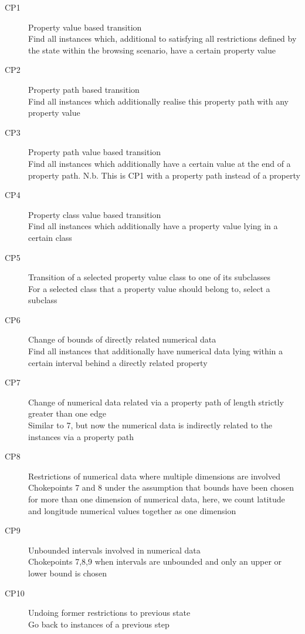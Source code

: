\begin{description}
\item[CP1] Property value based transition\\
Find all instances which, additional to satisfying all restrictions defined by the state within the browsing scenario, have a certain property value
\item[CP2] Property path based transition\\
Find all instances which additionally realise this property path with any property value
\item[CP3] Property path value based transition\\ 
Find all instances which additionally have a certain value at the end of a property path.
N.b. This is CP1 with a property path instead of a property
\item[CP4] Property class value based transition\\
Find all instances which additionally have a property value lying in a certain class
\item[CP5] Transition of a selected property value class to one of its subclasses \\
For a selected class that a property value should belong to, select a subclass
\item[CP6] Change of bounds of directly related numerical data\\
Find all instances that additionally have numerical data lying within a certain interval behind a directly related property
\item[CP7] Change of numerical data related via a property path of length strictly greater than one edge\\
Similar to 7, but now the numerical data is indirectly related to the instances via a property path
\item[CP8] Restrictions of numerical data where multiple dimensions are involved\\
Chokepoints 7 and 8 under the assumption that bounds have been chosen for more than one dimension of numerical data, here, we count latitude and longitude numerical values together as one dimension
\item[CP9] Unbounded intervals involved in numerical data\\
Chokepoints 7,8,9 when intervals are unbounded and only an upper or lower bound is chosen
\item[CP10] Undoing former restrictions to previous state\\
Go back to instances of a previous step

\end{description}
